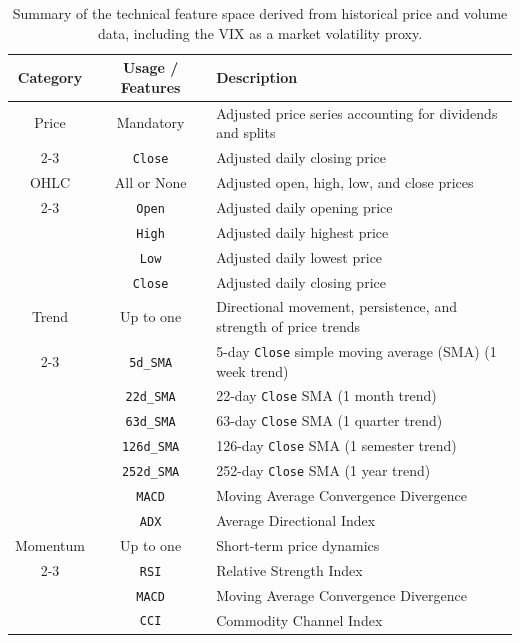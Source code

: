 \newpage
\begin{table}[H]

\centering
\caption{Summary of the technical feature space derived from historical price and volume data, including the VIX as a market volatility proxy.}
\label{tab:feature_categories}
\renewcommand{\arraystretch}{1.2}
\begin{tabular}{|c|c|p{9cm}|}
\hline
\textbf{Category} & \textbf{Usage / Features} & \textbf{Description} \\
\hline

Price & Mandatory & Adjusted price series accounting for dividends and splits \\
\cline{2-3}
 & \texttt{Close} & Adjusted daily closing price \\
\hline

OHLC & All or None & Adjusted open, high, low, and close prices \\
\cline{2-3}
 & \texttt{Open} & Adjusted daily opening price \\
 & \texttt{High} & Adjusted daily highest price \\
 & \texttt{Low} & Adjusted daily lowest price \\
 & \texttt{Close} & Adjusted daily closing price \\
\hline

Trend & Up to one & Directional movement, persistence, and strength of price trends \\
\cline{2-3}
 & \texttt{5d\_SMA} & 5-day \texttt{Close} simple moving average (SMA) (1 week trend) \\
 & \texttt{22d\_SMA} & 22-day \texttt{Close} SMA (1 month trend) \\
 & \texttt{63d\_SMA} & 63-day \texttt{Close} SMA (1 quarter trend) \\
 & \texttt{126d\_SMA} & 126-day \texttt{Close} SMA (1 semester trend) \\
 & \texttt{252d\_SMA} & 252-day \texttt{Close} SMA (1 year trend) \\
 & \texttt{MACD} & Moving Average Convergence Divergence \\
 & \texttt{ADX} & Average Directional Index \\
\hline

Momentum & Up to one & Short-term price dynamics \\
\cline{2-3}
 & \texttt{RSI} & Relative Strength Index \\
 & \texttt{MACD} & Moving Average Convergence Divergence \\
 & \texttt{CCI} & Commodity Channel Index \\
\hline


\end{tabular}
\end{table}

